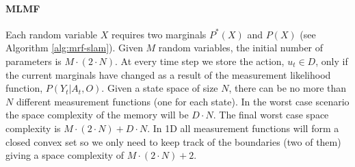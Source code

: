 \paragraph{MLMF}

Each random variable $X$ requires two marginals $P^{*}(X)$ and $P(X)$ (see Algorithm \ref{alg:mrf-slam}). Given
$M$ random variables, the initial number of parameters is $M \cdot (2 \cdot N)$. At every time step we store 
the action, $u_t \in D$, only if the current marginals have changed as a result of the measurement likelihood function, $P(Y_t|A_t,O)$.
Given a state space of size $N$, there can be no more than $N$ different measurement functions (one for each state). In
the worst case scenario the space complexity of the memory will be $D\cdot N$. The final worst case space complexity is
$M \cdot (2 \cdot N) + D \cdot N$. In 1D all measurement functions will form a closed convex set so we only need to 
keep track of the boundaries (two of them) giving a space complexity of  $M \cdot (2 \cdot N) + 2$.


